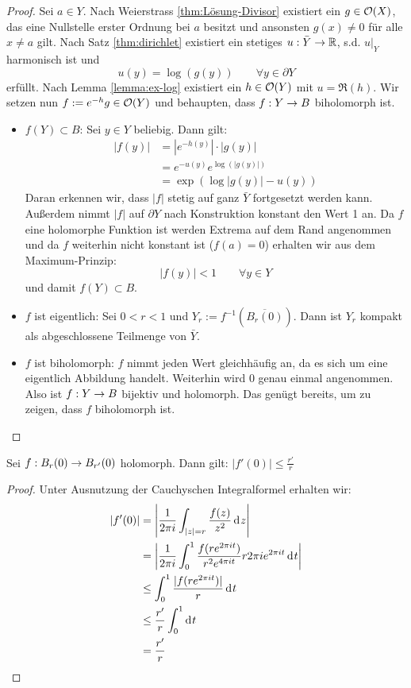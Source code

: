 \begin{proof}
  Sei $a \in Y$. Nach Weierstrass \ref{thm:Lösung-Divisor} existiert ein $g \in
  \mathcal{O}(X)$, das eine Nullstelle erster Ordnung bei $a$ besitzt und
  ansonsten $g(x) \neq 0$ für alle $x \neq a$ gilt. 
  Nach Satz \ref{thm:dirichlet} existiert ein stetiges $u: \bar Y \rightarrow
  \mathbb{R}$, s.d. $u|_Y$ harmonisch ist und
  \[
  u(y) = \log(g(y)) \qquad \forall y \in \partial Y
  \]
  erfüllt. 
  Nach Lemma \ref{lemma:ex-log} existiert ein $h \in \mathcal{O}(Y)$ mit $u =
  \Re(h)$. 
  Wir setzen nun $f := e^{-h} g \in \mathcal{O}(Y)$ und behaupten, dass $f: Y \rightarrow
  B$ biholomorph ist.
  \begin{itemize}
  \item $f(Y) \subset B$: Sei $y \in Y$ beliebig. Dann gilt:
    \begin{align*}
      |f(y)| & = | e^{-h(y)} | \cdot | g(y)| \\
      & = e^{-u(y)} e^{\log(|g(y)|)} \\
      & = \exp(\log|g(y)| - u(y))
    \end{align*}
    Daran erkennen wir, dass $|f|$ stetig auf ganz $\bar Y$ fortgesetzt werden
    kann. Außerdem nimmt $|f|$ auf $\partial Y$ nach Konstruktion konstant den Wert 1 an. Da
    $f$ eine holomorphe Funktion ist werden Extrema auf dem Rand
    angenommen und da $f$ weiterhin nicht konstant ist ($f(a) = 0$)
    erhalten wir aus dem Maximum-Prinzip:
    \[
    |f(y)| < 1 \qquad \forall y \in Y
    \]
    und damit $f(Y) \subset B$.
  \item $f$ ist eigentlich: Sei $0 < r < 1$ und $Y_r :=
    f^{-1}(\overline{B_r(0)})$. 
    Dann ist $Y_r$ kompakt als abgeschlossene Teilmenge von $\bar Y$.
  \item $f$ ist biholomorph: $f$ nimmt jeden Wert gleichhäufig an, da
    es sich um eine eigentlich Abbildung handelt. Weiterhin wird $0$
    genau einmal angenommen. Also ist $f: Y \rightarrow B$ bijektiv und
    holomorph. Das genügt bereits, um zu zeigen, dass $f$ biholomorph
    ist.

  \end{itemize}

\end{proof}

\begin{prop}
  \label{prop:kreis}
  Sei $f: B_r(0) \rightarrow B_{r'}(0)$ holomorph. Dann gilt: $|f'(0)| \leq \frac{r'}{r}$
\end{prop}

\begin{proof}
  Unter Ausnutzung der Cauchyschen Integralformel erhalten wir:
  \begin{align*}
    |f'(0)| & = \left | \frac{1}{2\pi i} \int_{|z| = r} \frac{f(z)}{z^2}
      \d[z] \right | \\
    & = \left | \frac{1}{2 \pi i} \int_0^1 \frac{f(r e^{2\pi it})}{r^2
        e^{4\pi i t}} r 2\pi i e^{2\pi i t} \d[t] \right | \\
    & \leq \int_0^1 \frac{|f(r e^{2\pi it})|}{r} \d[t] \\
    & \leq \frac{r'}{r} \int_0^1 \d[t] \\
    & = \frac{r'}{r}
  \end{align*}
\end{proof}

